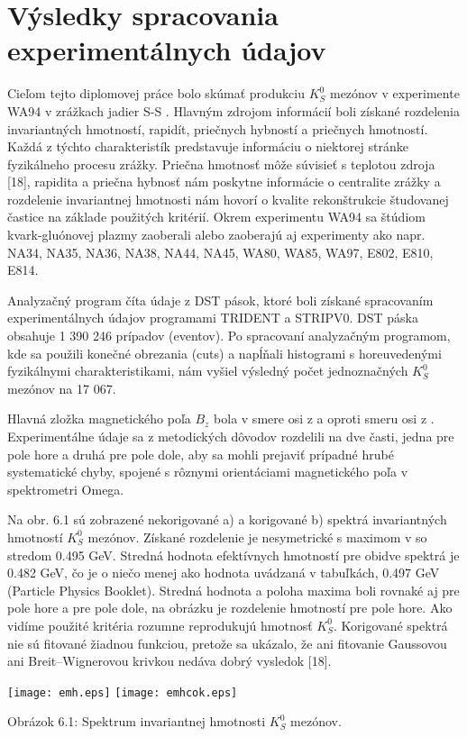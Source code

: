 
%

\chapter{Výsledky spracovania experimentálnych údajov}
Cieľom tejto diplomovej práce bolo skúmať produkciu $K^{0}_{S}$ mezónov v
experimente WA94 v zrážkach jadier S-S . Hlavným zdrojom
informácií boli získané  rozdelenia  invariantných hmotností, rapidít,
priečnych hybností a priečnych hmotností. Každá z týchto charakteristík
predstavuje informáciu o niektorej stránke fyzikálneho procesu zrážky.
Priečna hmotnosť môže súvisieť s teplotou zdroja [18], rapidita a priečna
hybnosť nám poskytne informácie o centralite zrážky a rozdelenie invariantnej
hmotnosti nám hovorí o kvalite rekonštrukcie študovanej častice na základe
použitých kritérií. Okrem  experimentu WA94 sa štúdiom kvark-gluónovej plazmy
zaoberali alebo zaoberajú aj experimenty ako napr. NA34, NA35, NA36, NA38,
NA44, NA45, WA80, WA85, WA97, E802, E810, E814.

Analyzačný program číta údaje z  DST pások, ktoré boli získané
spracovaním experimentálnych údajov programami TRIDENT a STRIPV0.
DST páska obsahuje  1 390 246 prípadov (eventov).  
Po spracovaní analyzačným programom, kde sa použili konečné obrezania
(cuts) a napĺňali histogrami s horeuvedenými fyzikálnymi charakteristikami,
nám vyšiel výsledný počet  jednoznačných  $K^{0}_{S}$ mezónov na 17 067. 

Hlavná zložka magnetického poľa $B_{z}$ bola v smere osi z  a
oproti smeru osi z . Experimentálne údaje sa z metodických
dôvodov rozdelili na dve časti, jedna pre pole hore a druhá pre
pole  dole, aby sa mohli prejaviť prípadné  hrubé systematické chyby,
spojené s rôznymi orientáciami magnetického poľa v spektrometri Omega.

Na obr. 6.1 sú zobrazené nekorigované a) a korigované b) spektrá
invariantných  hmotností $K^{0}_{S}$ mezónov. Získané rozdelenie je
nesymetrické s maximom v  so stredom 0.495 GeV. Stredná hodnota
efektívnych hmotností pre obidve spektrá je 0.482 GeV, čo je o niečo menej
ako hodnota uvádzaná v tabuľkách, 0.497 GeV (Particle Physics Booklet).
Stredná hodnota a poloha maxima boli rovnaké aj pre pole hore a pre pole
dole, na obrázku je rozdelenie hmotností pre pole hore. Ako vidíme použité
kritéria rozumne reprodukujú hmotnosť $K^{0}_{S}$. Korigované spektrá nie sú
fitované žiadnou funkciou, pretože sa ukázalo, že ani fitovanie Gaussovou ani
Breit--Wignerovou krivkou nedáva dobrý vysledok [18].
\begin{center}
 \texttt{[image: emh.eps]} 
 \texttt{[image: emhcok.eps]}
\end{center}
\begin{center}
  Obrázok 6.1: Spektrum invariantnej hmotnosti $K^{0}_{S}$ mezónov.
\end{center}

